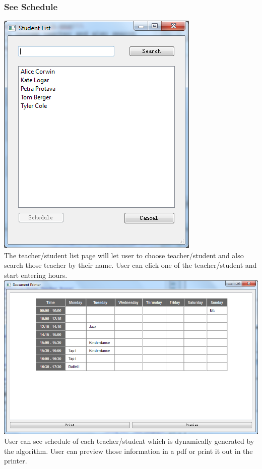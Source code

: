 \subsubsection{See Schedule}
\includegraphics[scale=0.5]{pics/schedule_main.png}\\
The teacher/student list page will let user to choose teacher/student and also search those teacher by their name. User can click one of the teacher/student and start entering hours.\\
\includegraphics[scale=0.5]{pics/schedule_dialog.png}\\
User can see schedule of each teacher/student which is dynamically generated by the algorithm. User can preview those information in a pdf or print it out in the printer.\\

